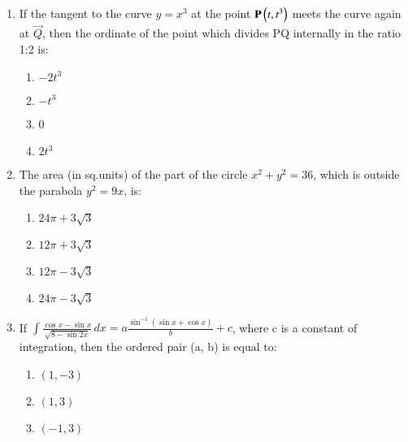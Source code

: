 \documentclass[journal]{IEEEtran}
\numberwithin{equation}{enumi}
\numberwithin{figure}{enumi}
\begin{document}
\begin{enumerate}
    \begin{multicols}{4}
    \begin{enumerate}
        \item 25
        \item $20\sqrt{3}$
        \item 30
        \item $25\sqrt{3}$
    \end{enumerate}
    \end{multicols}
    \item If the tangent to the curve $y = x^3$ at the point $\mathbf{P}\left(t, t^3\right)$ meets the curve again at $\vec{Q}$, then the ordinate of the point which divides PQ internally in the ratio 1:2 is: \\
    \begin{multicols}{4}
    \begin{enumerate}
        \item $-2t^3$
        \item $-t^3$
        \item 0
        \item $2t^3$
    \end{enumerate}
    \end{multicols}
    \item The area (in sq.units) of the part of the circle $x^2 + y^2 = 36$, which is outside the parabola $y^2 = 9x$, is: \\
    \begin{multicols}{4}
    \begin{enumerate}
        \item $24\pi + 3\sqrt{3}$
        \item $12\pi + 3\sqrt{3}$
        \item $12\pi - 3\sqrt{3}$
        \item $24\pi - 3\sqrt{3}$
    \end{enumerate}
    \end{multicols}
    \item If $\int \frac{\cos x - \sin x}{\sqrt{8 - \sin 2x}} \, dx = a \frac{\sin^{-1}(\sin x + \cos x)}{b} + c$, where c is a constant of integration, then the ordered pair (a, b) is equal to: \\
    \begin{multicols}{4}
    \begin{enumerate}
        \item $(1,-3)$
        \item $(1,3)$
        \item $(-1,3)$

\end{enumerate}
\end{multicols}
\end{enumerate}
\end{document}
